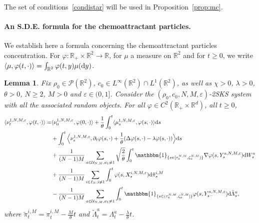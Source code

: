 \documentclass[11pt]{article}
\newtheorem{lemma}[theorem]{Lemma}
\newcommand{\R}{\mathbb{R}}
\newcommand{\1}{\mathbbm{1}}
\newcommand{\dd}{{\rm d}}
\newcommand{\Pp}{\mathcal P}
\newcommand{\Uu}{\mathcal U}
\newcommand{\e}{\varepsilon}
\newcommand{\sm}{{s-}}
\begin{document}
The set of conditions~\eqref{condistar} will be used in Proposition~\ref{prop:mc}.

\paragraph{An S.D.E. formula for the chemoattractant particles.}
We establish here a formula concerning the chemoattractant particles concentration.
For $\varphi:\R_+\times\R^2 \to \R$, for $\mu$ a measure on $\R^2$ and for $t\geq 0$, we write 
$\langle \mu,\varphi(t,\cdot)\rangle=\int_{\R^2}\varphi(t,y)\mu(\dd y)$.

\begin{lemma}\label{itonu} 
Fix $\rho_0 \in \Pp(\R^2)$, $c_0 \in L^\infty(\R^2)\cap L^1(\R^2)$, as well as $\chi>0$, $\lambda>0$, 
$\theta>0$, $N\geq 2$, $M>0$ and $\e\in (0,1]$. Consider the $(\rho_0,c_0,N,M,\e)$-2SKS system
with all the associated random objects. For all $\varphi \in C^{2}(\R_+\times\R^d)$, all $t\geq 0$,
\begin{align*}
\langle \nu^{1,N,M,\e}_t,\varphi(t,\cdot)\rangle=& \langle \nu^{1,N,M,\e}_0,\varphi(0,\cdot)\rangle
+\frac 1 \theta \int_0^t \langle \mu^{1,N,M,\e}_s,\varphi(s,\cdot)\rangle\dd s\\
&+ \int_0^t \Big\langle  \nu^{1,N,M,\e}_s, \partial_t\varphi(s,\cdot)+\frac1\theta(\Delta \varphi(s,\cdot)
-\lambda \varphi(s,\cdot))\Big\rangle \dd s\\
&+\frac1{(N-1)M}\sum_{a \in \Uu_{N,M},a_1\neq 1}\sqrt{\frac 2 \theta}\int_0^t \1_{\{s\in [\tau_a^{N,M},\zeta_a^{N,M})\}} 
\nabla\varphi(s,Y^{a,N,M,\e}_s) \dd W^a_s\\
&+\frac1{(N-1)M}\sum_{i\in I_N,i\neq 1}\int_0^t\varphi(s,X^{i,N,M,\e}_s) \dd \tilde \pi_s^{i,M}\\
&-\frac1{(N-1)M}\sum_{a \in \Uu_{N,M},a_1\neq 1}\int_0^t \1_{\{s\in (\tau_a^{N,M},\zeta_a^{N,M}]\}}
\varphi(s,Y^{a,N,M,\e}_\sm) \dd \tilde \Lambda^a_s,
\end{align*}
where $\tilde \pi_t^{i,M}=\pi^{i,M}_t-\frac M\theta t$ and $\tilde \Lambda^a_t= \Lambda^a_t- \frac\lambda \theta t$.
\end{lemma}
\end{document}
